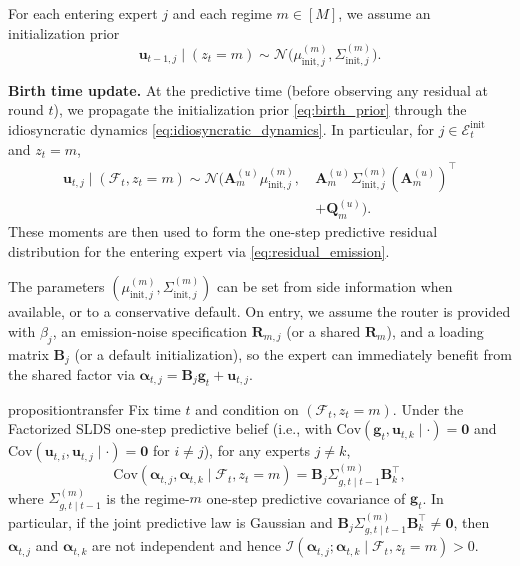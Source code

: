 For each entering expert \(j\) and each regime \(m\in[M]\), we assume an
initialization prior
\begin{equation}
\label{eq:birth_prior}
\mathbf{u}_{t-1,j}\mid(z_t=m)\sim \mathcal{N}\big(\mu^{(m)}_{\mathrm{init},j},\Sigma^{(m)}_{\mathrm{init},j}\big).
\end{equation}

\textbf{Birth time update.}
At the predictive time (before observing any residual at round \(t\)), we propagate the
initialization prior \eqref{eq:birth_prior} through the idiosyncratic dynamics
\eqref{eq:idiosyncratic_dynamics}. In particular, for \(j\in\mathcal{E}^{\mathrm{init}}_t\) and \(z_t=m\),
\begin{equation}
\label{eq:birth_time_update}
\begin{aligned}
    \mathbf{u}_{t,j}\mid(\mathcal{F}_t,z_t=m)
\sim
\mathcal{N}\!\Big(\mathbf{A}^{(u)}_{m}\mu^{(m)}_{\mathrm{init},j},\ &\mathbf{A}^{(u)}_{m}\Sigma^{(m)}_{\mathrm{init},j}(\mathbf{A}^{(u)}_{m})^\top \\
& +\mathbf{Q}^{(u)}_{m}\Big).
\end{aligned}
\end{equation}
These moments are then used to form the one-step predictive residual distribution for the entering
expert via \eqref{eq:residual_emission}.

The parameters \((\mu^{(m)}_{\mathrm{init},j},\Sigma^{(m)}_{\mathrm{init},j})\) can be set from side
information when available, or to a conservative default. On entry, we assume the router is provided
with \(\beta_j\), an emission-noise specification \(\mathbf{R}_{m,j}\) (or a shared \(\mathbf{R}_m\)),
and a loading matrix \(\mathbf B_j\) (or a default initialization), so the expert can immediately
benefit from the shared factor via \(\boldsymbol\alpha_{t,j}=\mathbf B_j\mathbf g_t+\mathbf u_{t,j}\).

\begin{restatable}{proposition}{transfer}
\label{prop:transfer}
Fix time \(t\) and condition on \((\mathcal{F}_t,z_t=m)\). Under the Factorized SLDS one-step predictive
belief (i.e., with \(\mathrm{Cov}(\mathbf{g}_t,\mathbf{u}_{t,k}\mid\cdot)=\mathbf{0}\) and
\(\mathrm{Cov}(\mathbf{u}_{t,i},\mathbf{u}_{t,j}\mid\cdot)=\mathbf{0}\) for \(i\neq j\)), for any experts \(j\neq k\),
\[
\mathrm{Cov}\left(\boldsymbol\alpha_{t,j},\boldsymbol\alpha_{t,k}\mid \mathcal{F}_t,z_t=m\right)
=
\mathbf{B}_j\Sigma^{(m)}_{g,t\mid t-1}\mathbf{B}_k^\top,
\]
where \(\Sigma^{(m)}_{g,t\mid t-1}\) is the regime-\(m\) one-step predictive covariance of \(\mathbf{g}_t\).
In particular, if the joint predictive law is Gaussian and
\(\mathbf{B}_j\Sigma^{(m)}_{g,t\mid t-1}\mathbf{B}_k^\top\neq \mathbf{0}\),
then \(\boldsymbol\alpha_{t,j}\) and \(\boldsymbol\alpha_{t,k}\) are not independent and hence
\(\mathcal{I}(\boldsymbol\alpha_{t,j};\boldsymbol\alpha_{t,k}\mid \mathcal{F}_t,z_t=m)>0\).
\end{restatable}

